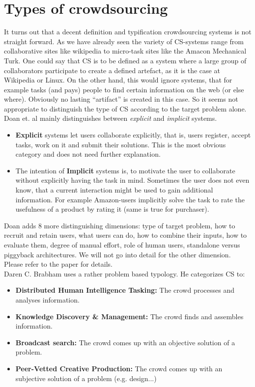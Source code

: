 \documentclass{acm_proc_article-sp}
\begin{document}
\section{Types of crowdsourcing}
\label{sect:types}
It turns out that a decent definition and typification crowdsourcing systems is not straight forward. As we have already seen the variety of CS-systems range from collaborative sites like wikipedia to micro-task sites like the Amacon Mechanical Turk. One could say that CS is to be defined as a system where a large group of collaborators participate to create a defined artefact, as it is the case at Wikipedia or Linux. On the other hand, this would ignore systems, that for example tasks (and pays) people to find certain information on the web (or else where). Obviously no lasting ``artifact'' is created in this case. So it seems not appropriate to distinguish the type of CS according to the target problem alone.\\
Doan et. al \cite{doan:crowd} mainly distinguishes between \textit{explicit} and \textit{implicit} systems.
\begin{itemize}
 \item \textbf{Explicit} systems let users collaborate explicitly, that is, users register, accept tasks, work on it and submit their solutions. This is the most obvious category and does not need further explanation.
 \item The intention of \textbf{Implicit} systems is, to motivate the user to collaborate without explicitly having the task in mind. Sometimes the user does not even know, that a current interaction might be used to gain additional information. For example Amazon-users implicitly solve the task to rate the usefulness of a product by rating it (same is true for purchaser).
\end{itemize}
Doan adds 8 more distinguishing dimensions: type of target problem, how to recruit and retain users, what users can do, how to combine their inputs, how to evaluate them, degree of manual effort, role of human users, standalone versus piggyback architectures. We will not go into detail for the other dimension. Please refer to the paper for details.\\
Daren C. Brabham\cite{brabham:crowd} uses a rather problem based typology. He categorizes CS to:
\begin{itemize}
  \item \textbf{Distributed Human Intelligence Tasking:} The crowd processes and analyses information.
  \item \textbf{Knowledge Discovery \& Management:} The crowd finds and assembles information.
  \item \textbf{Broadcast search:} The crowd comes up with an objective solution of a problem.
  \item \textbf{Peer-Vetted Creative Production:} The crowd comes up with an subjective solution of a problem (e.g. design...)
\end{itemize}
\end{document}
